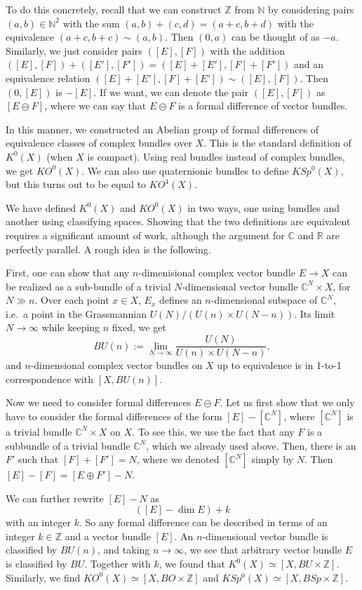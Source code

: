 \documentclass[12pt]{article}
\numberwithin{equation}{section}
\numberwithin{figure}{section}
\theoremstyle{remark}
\def\bC{\mathbb{C}}
\def\bN{\mathbb{N}}
\def\bR{\mathbb{R}}
\def\bZ{\mathbb{Z}}
\begin{document}
To do this concretely, recall that we can construct $\bZ$ from $\bN$ 
by considering pairs $(a,b) \in \bN^2$ with the sum $(a,b)+(c,d)=(a+c,b+d)$
with the equivalence $(a+c,b+c)\sim (a,b)$. Then $(0,a)$ can be thought of as $-a$.
Similarly, we just consider pairs $([E],[F])$ with the addition $([E],[F])+([E'],[F'])=([E]+[E'],[F]+[F'])$
and an equivalence relation $([E]+[E'],[F]+[E'])\sim ([E],[F])$. Then $(0,[E])$ is $-[E]$.
If we want, we can denote the pair $([E],[F])$ as $[E\ominus F]$, 
where we can say that $E\ominus F$ is a formal difference of vector bundles.

In this manner, we constructed an Abelian group of formal differences of equivalence classes of complex bundles over $X$.
This is the standard definition of $K^0(X)$ (when $X$ is compact).
Using real bundles instead of complex bundles, we get $KO^0(X)$.
We can also use quaternionic bundles to define $KSp^0(X)$, but this turns out to be equal to $KO^4(X)$.

We have defined  $K^0(X)$ and $KO^0(X)$ in two ways, one using bundles and another using classifying spaces.
Showing that the two definitions are equivalent requires a significant amount of work,
although the argument for $\bC$ and $\bR$ are perfectly parallel.
A rough idea is the following. 

First, one can show that any $n$-dimenisional complex vector bundle $E\to X$ 
can be realized as a sub-bundle of a trivial $N$-dimensional vector bundle $\bC^N\times X$,
for $N\gg n$.
Over each point $x\in X$, $E_x$ defines an $n$-dimensional subspace of $\bC^N$,
i.e.~a point in the Grassmannian $U(N)/(U(n)\times U(N-n))$.
Its limit  $N\to\infty$ while keeping $n$ fixed, we get \begin{equation}
BU(n) := \lim_{N\to \infty} \frac{U(N)}{U(n)\times U(N-n)}, 
\end{equation} and $n$-dimensional complex vector bundles on $X$ up to equivalence
is in 1-to-1 correspondence with $[X,BU(n)]$.

Now we need to consider formal differences $E\ominus F$.
Let us first show that we only have to consider the formal differences of the form $[E]-[\bC^N]$,
where $[\bC^N]$ is a trivial bundle $\bC^N \times X$  on $X$.
To see this, we use the fact that any $F$ is a subbundle of a trivial bundle $\bC^N$,
which we already used above.
Then, there is an $F'$ such that $[F]+[F']=N$, where we denoted $[\bC^N]$ simply by $N$.
Then $[E]-[F] = [E\oplus F']-N$.

We can further rewrite $[E]-N$ as \begin{equation}
([E]-\dim E) + k
\end{equation} with an integer $k$. So any formal difference can be described in terms of an integer $k\in \bZ$
and a vector bundle $[E]$.
An $n$-dimensional vector bundle is classified by $BU(n)$,
and taking $n\to\infty$, we see that arbitrary vector bundle $E$ is classified by $BU$.
Together with $k$, we found that $K^0(X)\simeq [X, BU\times \bZ]$. 
Similarly, we find $KO^0(X)\simeq [X,BO\times \bZ]$ and $KSp^0(X)\simeq [X,BSp\times \bZ]$.
\end{document}
